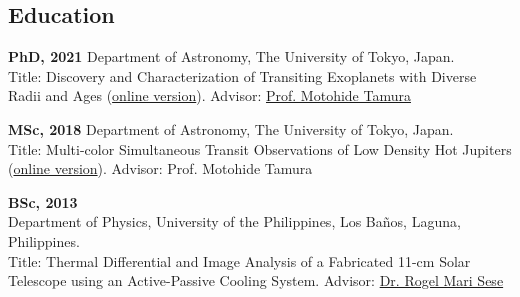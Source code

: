 \documentclass[12pt,letterpaper]{article}
\begin{document}
\subsection{Education}
\begin{list}{}{\cvlist}
    \item
        \textbf{PhD, 2021} Department of Astronomy, The University of Tokyo, Japan.\\
        Title: Discovery and Characterization of Transiting Exoplanets with Diverse Radii and Ages (\href{\phdthesisurl}{online version}).
        Advisor: \href{\tamuraurl}{Prof. Motohide Tamura}
    \item
        \textbf{MSc, 2018} Department of Astronomy, The University of Tokyo, Japan.\\
        Title: Multi-color Simultaneous Transit Observations of Low Density Hot Jupiters (\href{https://github.com/jpdeleon/thesis-master/tree/master}{online version}).
        Advisor: Prof. Motohide Tamura
    \item
        \textbf{BSc, 2013}\\
        Department of Physics, University of the Philippines, Los Ba\~nos, Laguna, Philippines.\\
        Title: Thermal Differential and Image Analysis of a Fabricated 11-cm Solar Telescope using an Active-Passive Cooling System.
        Advisor: \href{\seseurl}{Dr. Rogel Mari Sese}      
\end{list}
\end{document}
